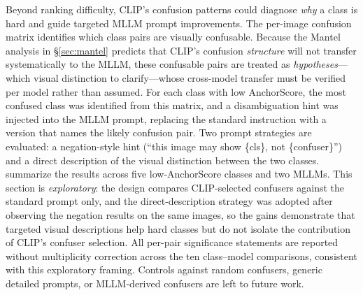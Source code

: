 \documentclass[11pt,a4paper]{article}
\begin{document}
Beyond ranking difficulty, CLIP's confusion patterns could diagnose \emph{why} a class is hard and guide targeted MLLM prompt improvements. The per-image confusion matrix identifies which class pairs are visually confusable. Because the Mantel analysis in \S\ref{sec:mantel} predicts that CLIP's confusion \emph{structure} will not transfer systematically to the MLLM, these confusable pairs are treated as \emph{hypotheses}---which visual distinction to clarify---whose cross-model transfer must be verified per model rather than assumed. For each class with low AnchorScore, the most confused class was identified from this matrix, and a disambiguation hint was injected into the MLLM prompt, replacing the standard instruction with a version that names the likely confusion pair. Two prompt strategies are evaluated: a negation-style hint (``this image may show \{cls\}, not \{confuser\}'') and a direct description of the visual distinction between the two classes.  summarize the results across five low-AnchorScore classes and two MLLMs. This section is \emph{exploratory}: the design compares CLIP-selected confusers against the standard prompt only, and the direct-description strategy was adopted after observing the negation results on the same images, so the gains demonstrate that targeted visual descriptions help hard classes but do not isolate the contribution of CLIP's confuser selection. All per-pair significance statements are reported without multiplicity correction across the ten class--model comparisons, consistent with this exploratory framing. Controls against random confusers, generic detailed prompts, or MLLM-derived confusers are left to future work.
\end{document}
